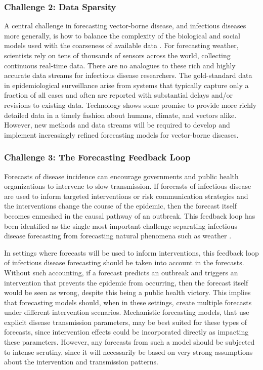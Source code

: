 \documentclass[a4paper]{article}
\begin{document}
\subsubsection*{Challenge 2: Data Sparsity}

A central challenge in forecasting vector-borne disease, and infectious diseases more generally, is how to balance the complexity of the biological and social models used with the coarseness of available data \cite{moran2016epidemic}.
For forecasting weather, scientists rely on tens of thousands of sensors across the world, collecting continuous real-time data. 
There are no analogues to these rich and highly accurate data streams for infectious disease researchers.
The gold-standard data in epidemiological surveillance arise from systems that typically capture only a fraction of all cases and often are reported with substantial delays and/or revisions to existing data.
Technology shows some promise to provide more richly detailed data in a timely fashion about humans, climate, and vectors alike.\cite{george2019}
However, new methods and data streams will be required to develop and implement increasingly refined forecasting models for vector-borne diseases.

\subsubsection*{Challenge 3: The Forecasting Feedback Loop}

Forecasts of disease incidence can encourage governments and public health organizations to intervene to slow transmission.
If forecasts of infectious disease are used to inform targeted interventions or risk communication strategies and the interventions change the course of the epidemic, then the forecast itself becomes enmeshed in the causal pathway of an outbreak. 
This feedback loop has been identified as the single most important challenge separating infectious disease forecasting from forecasting natural phenomena such as weather \cite{moran2016epidemic}.

In settings where forecasts will be used to inform interventions, this feedback loop of infectious disease forecasting should be taken into account in the forecasts. 
Without such accounting, if a forecast predicts an outbreak and triggers an intervention that prevents the epidemic from occurring, then the forecast itself would be seen as wrong, despite this being a public health victory. 
This implies that forecasting models should, when in these settings, create multiple forecasts under different intervention scenarios. 
Mechanistic forecasting models, that use explicit disease transmission parameters, may be best suited for these types of forecasts, since intervention effects could be incorporated directly as impacting these parameters.
However, any forecasts from such a model should be subjected to intense scrutiny, since it will necessarily be based on very strong assumptions about the intervention and transmission patterns. 
\end{document}
